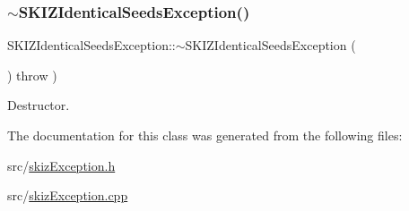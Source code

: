 \subsubsection{\texorpdfstring{$\sim$\+S\+K\+I\+Z\+Identical\+Seeds\+Exception()}{~SKIZIdenticalSeedsException()}}
{\footnotesize\ttfamily S\+K\+I\+Z\+Identical\+Seeds\+Exception\+::$\sim$\+S\+K\+I\+Z\+Identical\+Seeds\+Exception (\begin{DoxyParamCaption}{ }\end{DoxyParamCaption}) throw  ) \hspace{0.3cm}{\ttfamily [virtual]}}



Destructor. 



The documentation for this class was generated from the following files\+:\begin{DoxyCompactItemize}
\item 
src/\mbox{\hyperlink{skizException_8h}{skiz\+Exception.\+h}}\item 
src/\mbox{\hyperlink{skizException_8cpp}{skiz\+Exception.\+cpp}}\end{DoxyCompactItemize}
